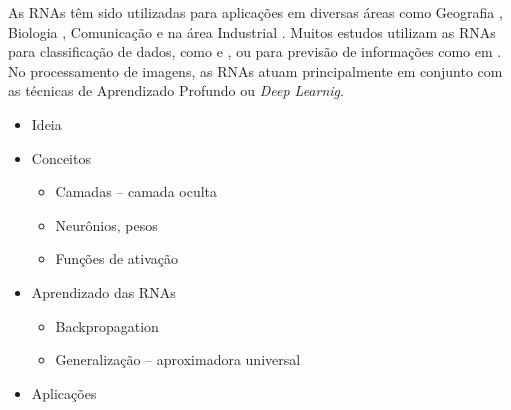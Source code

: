 \newpage

As RNAs têm sido utilizadas para aplicações em diversas áreas como Geografia \cite{ref11:teive}, Biologia \cite{ref7:duarte}, Comunicação \cite{ref12:balieiro} e na área Industrial \cite{ref4:prego}. Muitos estudos utilizam as RNAs para classificação de dados, como \cite{ref1:guedes} e \cite{ref3:lima}, ou para previsão de informações como em \cite{ref7:duarte}. No processamento de imagens, as RNAs atuam principalmente em conjunto com as técnicas de Aprendizado Profundo ou \textit{Deep Learnig}.

\begin{itemize}
	\item Ideia
	\item Conceitos
	\begin{itemize}
		\item Camadas -- camada oculta
		\item Neurônios, pesos
		\item Funções de ativação
	\end{itemize}
	\item Aprendizado das RNAs
	\begin{itemize}
		\item Backpropagation
		\item Generalização -- aproximadora universal
	\end{itemize}
	\item Aplicações
\end{itemize}
